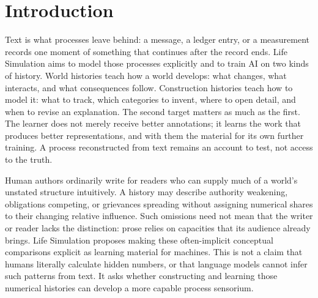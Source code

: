 \documentclass[10pt]{article}
\begin{document}

\ewfrontmatterend

\section{Introduction}
\label{sec:introduction}

Text is what processes leave behind: a message, a ledger entry, or a measurement
records one moment of something that continues after the record ends. Life
Simulation aims to model those processes explicitly and to train AI on two
kinds of history. World histories teach how a world develops: what changes,
what interacts, and what consequences follow. Construction histories teach
how to model it: what to track, which categories to invent, where to open
detail, and when to revise an explanation. The second target matters as much
as the first. The learner does not merely receive better annotations; it
learns the work that produces better representations, and with them the
material for its own further training. A process reconstructed from text
remains an account to test, not access to the truth.

Human authors ordinarily write for readers who can supply much of a world's
unstated structure intuitively. A history may describe authority weakening,
obligations competing, or grievances spreading without assigning numerical
shares to their changing relative influence. Such omissions need not mean
that the writer or reader lacks the distinction: prose relies on capacities
that its audience already brings. Life Simulation proposes making these
often-implicit conceptual comparisons explicit as learning
material for machines. This is not a claim that humans literally calculate
hidden numbers, or that language models cannot infer such patterns from text.
It asks whether constructing and learning those numerical histories can
develop a more capable process sensorium.
\end{document}
